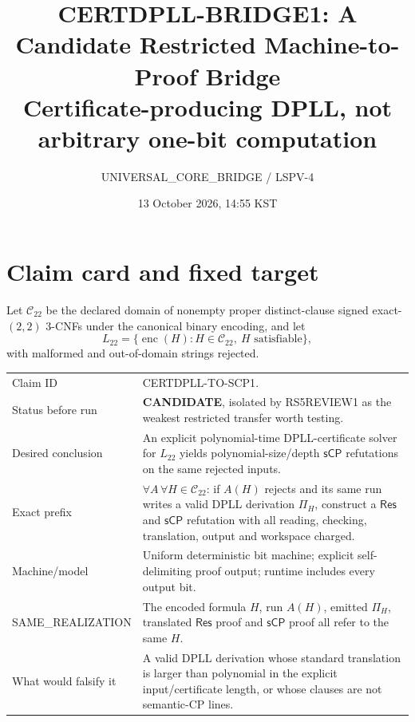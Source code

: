 \documentclass[11pt]{article}
\title{CERTDPLL-BRIDGE1: A Candidate Restricted Machine-to-Proof Bridge\\\large Certificate-producing DPLL, not arbitrary one-bit computation}
\author{UNIVERSAL\_CORE\_BRIDGE / LSPV-4}
\date{13 October 2026, 14:55 KST}
\newcommand{\Ltwo}{L_{22}}
\newcommand{\Res}{\mathsf{Res}}
\newcommand{\sCP}{\mathsf{sCP}}
\newcommand{\CAND}{\textbf{CANDIDATE}}
\begin{document}
\maketitle

\begin{center}
\end{center}

\section{Claim card and fixed target}
Let $\mathcal C_{22}$ be the declared domain of nonempty proper
distinct-clause signed exact-$(2,2)$ 3-CNFs under the canonical binary
encoding, and let
\[
 \Ltwo=\{\operatorname{enc}(H):H\in\mathcal C_{22},\ H\text{ satisfiable}\},
\]
with malformed and out-of-domain strings rejected.

\begin{tabularx}{\textwidth}{@{}lX@{}}
\toprule
Claim ID & \textsf{CERTDPLL-TO-SCP1}.\\
Status before run & \CAND{}, isolated by RS5REVIEW1 as the weakest restricted transfer worth testing.\\
Desired conclusion & An explicit polynomial-time DPLL-certificate solver for $\Ltwo$ yields polynomial-size/depth $\sCP$ refutations on the same rejected inputs.\\
Exact prefix & $\forall A\,\forall H\in\mathcal C_{22}$: if $A(H)$ rejects and its same run writes a valid DPLL derivation $\Pi_H$, construct a $\Res$ and $\sCP$ refutation with all reading, checking, translation, output and workspace charged.\\
Machine/model & Uniform deterministic bit machine; explicit self-delimiting proof output; runtime includes every output bit.\\
SAME\_REALIZATION & The encoded formula $H$, run $A(H)$, emitted $\Pi_H$, translated $\Res$ proof and $\sCP$ proof all refer to the same $H$.\\
What would falsify it & A valid DPLL derivation whose standard translation is larger than polynomial in the explicit input/certificate length, or whose clauses are not semantic-CP lines.\\
\bottomrule
\end{tabularx}
\end{document}
